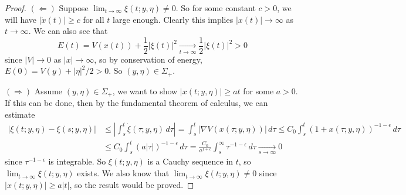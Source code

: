 \begin{proof}
  $(\Leftarrow)$ Suppose
  $\lim_{t \to \infty} \xi(t; y, \eta) \ne 0$.
  So for some constant $c > 0$, we will have
  $|\dot{x}(t)| \ge c$ for all $t$ large enough.
  Clearly this implies $|x(t)| \to \infty$ as
  $t \to \infty$.
  We can also see that
  \[
    E(t) = V(x(t)) + \frac{1}{2} |\xi(t)|^2
    \xrightarrow[t \to \infty]{} \frac{1}{2} |\xi(t)|^2 > 0
  \]
  since $|V| \to 0$ as $|x| \to \infty$, so
  by conservation of energy,
  $E(0) = V(y) + |\eta|^2 / 2 > 0$.
  So $(y, \eta) \in \Sigma_+$.

  $(\Rightarrow)$ Assume $(y, \eta) \in \Sigma_+$,
  we want to show $|x(t; y, \eta)| \ge at$
  for some $a > 0$. If this can be done, then
  by the fundamental theorem of calculus, we
  can estimate
  \begin{align*}
    |\xi(t; y, \eta) - \xi(s; y, \eta)|
    &\le \left|\int_s^t \dot{\xi}(\tau; y, \eta)\, d\tau\right|
    = \int_s^t |\nabla V(x(\tau; y, \eta))|\, d\tau
    \le C_0 \int_s^t (1 + x(\tau; y, \eta))^{-1 - \epsilon}\, d\tau \\
    &\le C_0 \int_s^t (a|\tau|)^{-1 - \epsilon}\, d\tau
    = \frac{C_0}{a^{1 + \epsilon}} \int_s^\infty \tau^{-1 - \epsilon}\, d\tau
    \xrightarrow[s \to \infty]{} 0
  \end{align*}
  since $\tau^{-1 - \epsilon}$ is integrable.
  So $\xi(t; y, \eta)$ is a Cauchy sequence in
  $t$, so $\lim_{t \to \infty} \xi(t; y, \eta)$ exists.
  We also know that
  $\lim_{t \to \infty} \xi(t; y, \eta) \ne 0$
  since $|x(t; y, \eta)| \ge a|t|$, so the
  result would be proved.


\end{proof}
